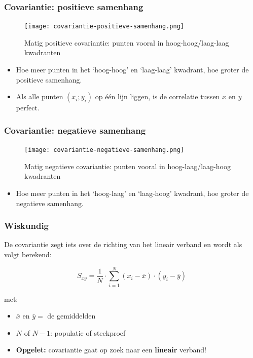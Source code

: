 \documentclass{article}
\begin{document}
\subsubsection{Covariantie: positieve samenhang}

\begin{figure}[H]
    \centering
    \texttt{[image: covariantie-positieve-samenhang.png]}
    \caption{Matig positieve covariantie: punten vooral in hoog-hoog/laag-laag kwadranten}
\end{figure}

\begin{itemize}
    \item Hoe meer punten in het `hoog-hoog' en `laag-laag' kwadrant, hoe groter de positieve samenhang.
    \item Als alle punten $(x_i; y_i)$ op één lijn liggen, is de correlatie tussen $x$ en $y$ perfect.
\end{itemize}

\subsubsection{Covariantie: negatieve samenhang}


\begin{figure}[H]
    \centering
    \texttt{[image: covariantie-negatieve-samenhang.png]}
    \caption{Matig negatieve covariantie: punten vooral in hoog-laag/laag-hoog kwadranten}
\end{figure}

\begin{itemize}
    \item Hoe meer punten in het `hoog-laag' en `laag-hoog' kwadrant, hoe groter de negatieve samenhang.
\end{itemize}

\subsubsection{Wiskundig}

De covariantie zegt iets over de richting van het lineair verband en wordt als volgt berekend:

\begin{equation}
S_{xy} = \frac{1}{N} \cdot \sum_{i=1}^N (x_i - \bar{x}) \cdot (y_i - \bar{y})
\end{equation}

met:

\begin{itemize}
    \item $\bar{x}$ en $\bar{y} =$ de gemiddelden
    \item $N$ of $N-1$: populatie of steekproef
    \item \textbf{Opgelet:} covariantie gaat op zoek naar een \textbf{lineair} verband!
\end{itemize}
\end{document}
